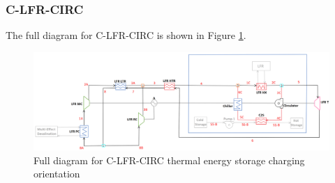 \begin{paracol}{2}
\linenumbers
\switchcolumn


\subsubsection{C-LFR-CIRC} 

The full diagram for C-LFR-CIRC is shown in Figure \ref{c-lfr-circ}.
\end{paracol}
\begin{figure}[H]
    \widefigure
    \includegraphics[width=\linewidth]{Definitions/c-lfr-circ.pdf}
    \caption{Full diagram for C-LFR-CIRC thermal energy storage charging orientation\label{c-lfr-circ}}
\end{figure}

